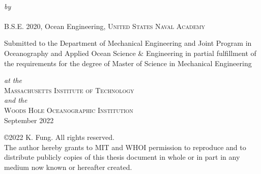 \def\signature#1#2{\par\noindent#1\dotfill\null\\*
  {\raggedleft #2\par}}


\makeatletter

\begin{titlepage}
  \begin{center}
    \begin{Large}
      \@title
    \end{Large}\\[0.1em]
    \emph{\footnotesize by}\\
    {\large \@author} \\[-0.25em]
    B.S.E. 2020, Ocean Engineering, \textsc{United States Naval Academy} \\ %
    
    \begin{singlespace}
    {Submitted to the Department of Mechanical Engineering and Joint Program in Oceanography and Applied Ocean Science \& Engineering in partial fulfillment of the requirements for the degree of Master of Science in Mechanical Engineering} \\
    \end{singlespace}
     \begin{singlespace}
    \emph{\footnotesize at the}\\
    {\large \textsc{Massachusetts Institute of Technology}} \\
    \emph{\footnotesize and the}\\
    {\large \textsc{Woods Hole Oceanographic Institution}} \\ [1 em]
    September 2022 \\[1em]
    \end{singlespace}
    \begin{singlespace}
    {\copyright2022 K. Fung. All rights reserved. \\ The author hereby grants to MIT and WHOI permission to reproduce and to distribute publicly copies of this thesis document in whole or in part in any medium now known or hereafter created.} \\ [2em]


\end{singlespace}
\end{center}
\end{titlepage}
